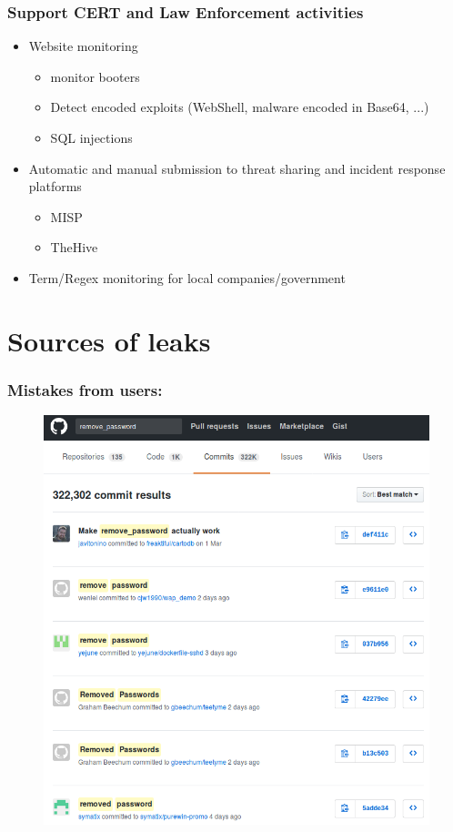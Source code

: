 \documentclass{beamer}
\begin{document}
\begin{frame}
    \frametitle{Support CERT and Law Enforcement activities}
    	\begin{itemize}
		    \item Website monitoring
		    	\begin{itemize}
				    \item monitor booters
				    \item Detect encoded exploits (WebShell, malware encoded in Base64, ...)
				    \item SQL injections
		    	\end{itemize}
		    \item Automatic and manual submission to threat sharing and incident
response platforms
			\begin{itemize}
				\item MISP
				\item TheHive
			\end{itemize}
		    \item Term/Regex monitoring for local companies/government
        \end{itemize}
\end{frame}

\section{Sources of leaks}

\begin{frame}
    \frametitle{Mistakes from users:}
        \begin{figure}
            \includegraphics[scale=0.4]{images/git-pass.png}
        \end{figure}
\end{frame}
\end{document}
